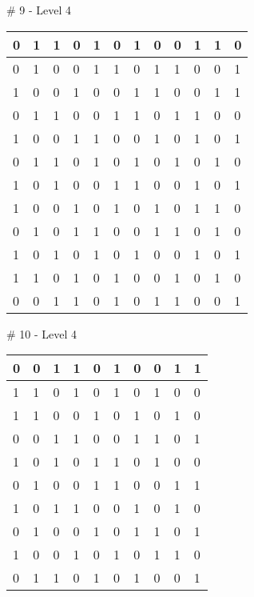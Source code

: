 \smallskip

\# 9 - Level 4 \newline
\begin{tabular}{|m{\collen}|m{\collen}|m{\collen}|m{\collen}|m{\collen}|m{\collen}|m{\collen}|m{\collen}|m{\collen}|m{\collen}|m{\collen}|m{\collen}|}
\hline
  0 & 1 & 1 & 0 & 1 & 0 & 1 & 0 & 0 & 1 & 1 & 0 \\
\hline
  0 & 1 & 0 & 0 & 1 & 1 & 0 & 1 & 1 & 0 & 0 & 1 \\
\hline
  1 & 0 & 0 & 1 & 0 & 0 & 1 & 1 & 0 & 0 & 1 & 1 \\
\hline
  0 & 1 & 1 & 0 & 0 & 1 & 1 & 0 & 1 & 1 & 0 & 0 \\
\hline
  1 & 0 & 0 & 1 & 1 & 0 & 0 & 1 & 0 & 1 & 0 & 1 \\
\hline
  0 & 1 & 1 & 0 & 1 & 0 & 1 & 0 & 1 & 0 & 1 & 0 \\
\hline
  1 & 0 & 1 & 0 & 0 & 1 & 1 & 0 & 0 & 1 & 0 & 1 \\
\hline
  1 & 0 & 0 & 1 & 0 & 1 & 0 & 1 & 0 & 1 & 1 & 0 \\
\hline
  0 & 1 & 0 & 1 & 1 & 0 & 0 & 1 & 1 & 0 & 1 & 0 \\
\hline
  1 & 0 & 1 & 0 & 1 & 0 & 1 & 0 & 0 & 1 & 0 & 1 \\
\hline
  1 & 1 & 0 & 1 & 0 & 1 & 0 & 0 & 1 & 0 & 1 & 0 \\
\hline
  0 & 0 & 1 & 1 & 0 & 1 & 0 & 1 & 1 & 0 & 0 & 1 \\
\hline
\end{tabular}


\smallskip

\# 10 - Level 4 \newline
\begin{tabular}{|m{\collen}|m{\collen}|m{\collen}|m{\collen}|m{\collen}|m{\collen}|m{\collen}|m{\collen}|m{\collen}|m{\collen}|}
\hline
  0 & 0 & 1 & 1 & 0 & 1 & 0 & 0 & 1 & 1 \\
\hline
  1 & 1 & 0 & 1 & 0 & 1 & 0 & 1 & 0 & 0 \\
\hline
  1 & 1 & 0 & 0 & 1 & 0 & 1 & 0 & 1 & 0 \\
\hline
  0 & 0 & 1 & 1 & 0 & 0 & 1 & 1 & 0 & 1 \\
\hline
  1 & 0 & 1 & 0 & 1 & 1 & 0 & 1 & 0 & 0 \\
\hline
  0 & 1 & 0 & 0 & 1 & 1 & 0 & 0 & 1 & 1 \\
\hline
  1 & 0 & 1 & 1 & 0 & 0 & 1 & 0 & 1 & 0 \\
\hline
  0 & 1 & 0 & 0 & 1 & 0 & 1 & 1 & 0 & 1 \\
\hline
  1 & 0 & 0 & 1 & 0 & 1 & 0 & 1 & 1 & 0 \\
\hline
  0 & 1 & 1 & 0 & 1 & 0 & 1 & 0 & 0 & 1 \\
\hline
\end{tabular}


